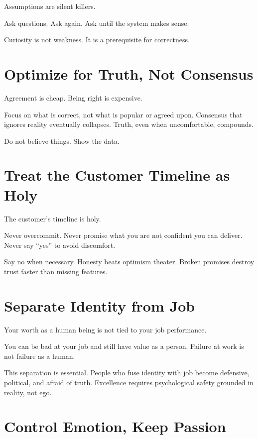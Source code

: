 Assumptions are silent killers.

Ask questions. Ask again. Ask until the system makes sense.

Curiosity is not weakness. It is a prerequisite for correctness.

\section{Optimize for Truth, Not
Consensus}\label{optimize-for-truth-not-consensus}

Agreement is cheap. Being right is expensive.

Focus on what is correct, not what is popular or agreed upon. Consensus
that ignores reality eventually collapses. Truth, even when
uncomfortable, compounds.

Do not believe things. Show the data.

\section{Treat the Customer Timeline as
Holy}\label{treat-the-customer-timeline-as-holy}

The customer's timeline is holy.

Never overcommit. Never promise what you are not confident you can
deliver. Never say ``yes'' to avoid discomfort.

Say no when necessary. Honesty beats optimism theater. Broken promises
destroy trust faster than missing features.

\section{Separate Identity from Job}\label{separate-identity-from-job}

Your worth as a human being is not tied to your job performance.

You can be bad at your job and still have value as a person. Failure at
work is not failure as a human.

This separation is essential. People who fuse identity with job become
defensive, political, and afraid of truth. Excellence requires
psychological safety grounded in reality, not ego.

\section{Control Emotion, Keep
Passion}\label{control-emotion-keep-passion}

